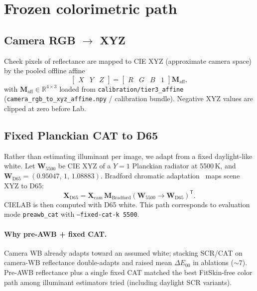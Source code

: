 \documentclass[11pt]{article}
\newcommand{\deee}{\ensuremath{\Delta E_{00}}}
\newcommand{\Maff}{\mathbf{M}_{\mathrm{aff}}}
\begin{document}
\section{Frozen colorimetric path}
\label{sec:color}

\subsection{Camera RGB $\to$ XYZ}
Cheek pixels of reflectance are mapped to CIE XYZ (approximate camera space) by the pooled offline affine
\begin{equation}
  \begin{bmatrix} X & Y & Z \end{bmatrix}
  =
  \begin{bmatrix} R & G & B & 1 \end{bmatrix}
  \Maff,
\end{equation}
with $\Maff\in\mathbb{R}^{4\times 3}$ loaded from \texttt{calibration/tier3\_affine}
(\texttt{camera\_rgb\_to\_xyz\_affine.npy} / calibration bundle).
Negative XYZ values are clipped at zero before Lab.

\subsection{Fixed Planckian CAT to D65}
Rather than estimating illuminant per image, we adapt from a fixed daylight-like white.
Let $\mathbf{W}_{5500}$ be CIE XYZ of a $Y{=}1$ Planckian radiator at 5500\,K, and $\mathbf{W}_{\mathrm{D65}}=(0.95047,\,1,\,1.08883)$.
Bradford chromatic adaptation~\cite{lam1985,fairchild2013} maps scene XYZ to D65:
\begin{equation}
  \mathbf{X}_{\mathrm{D65}}
  =
  \mathbf{X}_{\mathrm{cam}}\,
  \mathbf{M}_{\mathrm{Bradford}}(\mathbf{W}_{5500}\!\to\!\mathbf{W}_{\mathrm{D65}})^{\mathsf{T}}.
\end{equation}
CIELAB is then computed with D65 white.
This path corresponds to evaluation mode \texttt{preawb\_cat} with \texttt{--fixed-cat-k 5500}.

\paragraph{Why pre-AWB + fixed CAT.}
Camera WB already adapts toward an assumed white; stacking SCR/CAT on camera-WB reflectance double-adapts and raised mean $\deee$ in ablations (${\sim}7$).
Pre-AWB reflectance plus a single fixed CAT matched the best FitSkin-free color path among illuminant estimators tried (including daylight SCR variants).
\end{document}
